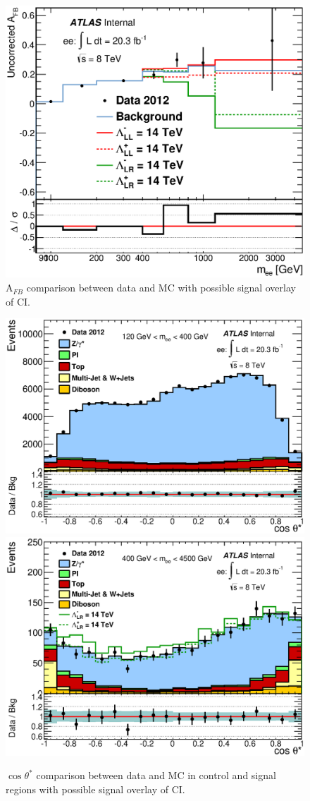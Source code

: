 	\begin{figure}[h]
	    \begin{center}
	    	\includegraphics[scale=0.6]{images/AFB_main.eps}
	    \end{center}
	   \caption{A$_{FB}$ comparison between data and MC with possible signal overlay of CI.}
	   \label{fig:AFB_main}
	\end{figure}


	\begin{figure}[h]
	    \begin{center}
	    	\includegraphics[width=0.49\linewidth]{images/CosThetaStar_Control_main.eps}
	    	\includegraphics[width=0.49\linewidth]{images/CosThetaStar_Signal_main.eps}
	    \end{center}
	   \caption{$\cos{\theta^{*}}$ comparison between data and MC in control and signal regions with possible signal overlay of CI.}
	   \label{fig:cosTS_main}
	\end{figure}


